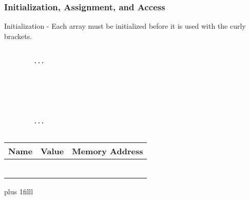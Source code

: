 \documentclass[fleqn]{beamer} %
\newcommand{\sectiontitleIII}{Initialization, Assignment, and Access}
\newcommand{\btVFill}{\vskip0pt plus 1filll}
\begin{document}
	\begin{frame}[label=sectionIII,containsverbatim] \small
	\frametitle{\sectiontitleIII}
	
	Initialization - Each array must be initialized before it is used with the curly brackets.  \vspace{5mm}\\
	
	\begin{multicols}{2}
		
		\begin{lstlisting}
		
		...
		
		
		
		
		
		
		...			
		
		\end{lstlisting}
		
		\renewcommand*{\arraystretch}{1.5}
		\begin{tabular}{c|c|c} 
			Name&Value&Memory Address\\ \hline
			& & \\ \hline
			& & \\ \hline
			& & \\ \hline
			& & \\ \hline
			& & \\ \hline
			& & \\ \hline
		\end{tabular}
		
		
		
	\end{multicols}
	
	\btVFill
	
	
	\end{frame}
\end{document}
